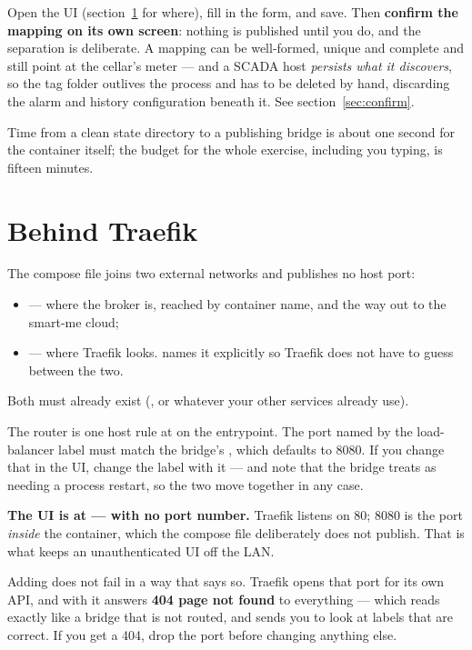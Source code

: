 Open the UI (section~\ref{sec:install-traefik} for where), fill in the form, and save.
Then \textbf{confirm the mapping on its own screen}: nothing is published until you
do, and the separation is deliberate. A mapping can be well-formed, unique and
complete and still point  at the cellar's meter --- and a SCADA host
\emph{persists what it discovers}, so the tag folder outlives the process and has to
be deleted by hand, discarding the alarm and history configuration beneath it. See
section~\ref{sec:confirm}.

Time from a clean state directory to a publishing bridge is about one second for the
container itself; the budget for the whole exercise, including you typing, is fifteen
minutes.

\section{Behind Traefik}
\label{sec:install-traefik}

The compose file joins two external networks and publishes no host port:

\begin{itemize}
  \item {} --- where the broker is, reached by container name, and the way
        out to the smart-me cloud;
  \item {} --- where Traefik looks.  names it
        explicitly so Traefik does not have to guess between the two.
\end{itemize}

Both must already exist (, or whatever your
other services already use).

The router is one host rule at  on the 
entrypoint. The port named by the load-balancer label must match the bridge's
, which defaults to 8080. If you change that in the UI, change the
label with it --- and note that the bridge treats  as needing a
process restart, so the two move together in any case.

\begin{warning}
\textbf{The UI is at  --- with no port number.}
Traefik listens on 80; 8080 is the port \emph{inside} the container, which the
compose file deliberately does not publish. That is what keeps an
unauthenticated UI off the LAN.

Adding  does not fail in a way that says so. Traefik opens that port
for its own API, and with  it answers \textbf{404 page
not found} to everything --- which reads exactly like a bridge that is not
routed, and sends you to look at labels that are correct. If you get a 404, drop
the port before changing anything else.
\end{warning}

